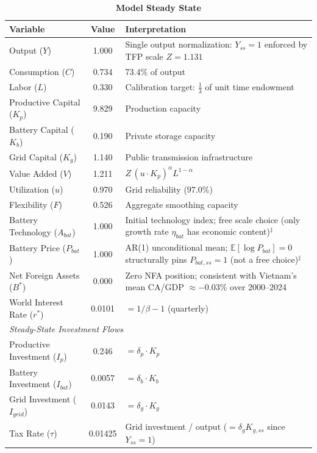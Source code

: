 \documentclass[12pt, a4paper]{article}
\begin{document}
	\begin{table}[H]
		\centering
		\caption{\textbf{Model Steady State}}
		\label{tab:steady_state}
		\renewcommand{\arraystretch}{1.3}
		\begin{tabular}{l c p{6.5cm}}
			\toprule
			\textbf{Variable} & \textbf{Value} & \textbf{Interpretation} \\
			\midrule
			Output ($Y$) & 1.000 & Single output normalization: $Y_{ss}=1$ enforced by TFP scale $Z=1.131$ \\
			Consumption ($C$) & 0.734 & 73.4\% of output \\
			Labor ($L$) & 0.330 & Calibration target: $\tfrac{1}{3}$ of unit time endowment \\
			Productive Capital ($K_p$) & 9.829 & Production capacity \\
			Battery Capital ($K_b$) & 0.190 & Private storage capacity \\
			Grid Capital ($K_g$) & 1.140 & Public transmission infrastructure \\
			Value Added ($V$) & 1.211 & $Z\,(u \cdot K_p)^\alpha L^{1-\alpha}$ \\
			Utilization ($u$) & 0.970 & Grid reliability (97.0\%) \\
			Flexibility ($F$) & 0.526 & Aggregate smoothing capacity \\
			Battery Technology ($A_{bat}$) & 1.000 & Initial technology index; free scale choice (only growth rate $\eta_{bat}$ has economic content)$^{\ddagger}$ \\
			Battery Price ($P_{bat}$) & 1.000 & AR(1) unconditional mean; $\mathbb{E}[\log P_{bat}]=0$ structurally pins $P_{bat,ss}=1$ (not a free choice)$^{\ddagger}$ \\
			Net Foreign Assets ($B^*$) & 0.000 & Zero NFA position; consistent with Vietnam's mean CA/GDP $\approx -0.03\%$ over 2000--2024 \\
			World Interest Rate ($r^*$) & 0.0101 & $= 1/\beta - 1$ (quarterly) \\
			\midrule
			\multicolumn{3}{l}{\textit{Steady-State Investment Flows}} \\
			Productive Investment ($I_p$) & 0.246 & $= \delta_p \cdot K_p$ \\
			Battery Investment ($I_{bat}$) & 0.0057 & $= \delta_b \cdot K_b$ \\
			Grid Investment ($I_{grid}$) & 0.0143 & $= \delta_g \cdot K_g$ \\
			Tax Rate ($\tau$) & 0.01425 & Grid investment / output ($=\delta_g K_{g,ss}$ since $Y_{ss}=1$) \\

\end{tabular}
\end{table}
\end{document}
